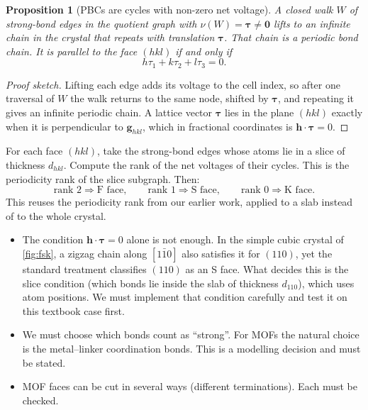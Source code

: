 \documentclass[11pt,a4paper]{article}
\newtheorem{proposition}{Proposition}
\theoremstyle{remark}\newtheorem*{example}{Worked example}
\newcommand{\vect}[1]{\mathbf{#1}}
\begin{document}
\begin{proposition}[PBCs are cycles with non-zero net voltage]\label{prop:pbc}
A closed walk $W$ of strong-bond edges in the quotient graph with $\nu(W)=\vect{\tau}\ne\vect{0}$ lifts to an infinite chain in the crystal that repeats with translation $\vect{\tau}$. That chain is a periodic bond chain. It is parallel to the face $(hkl)$ if and only if
\begin{equation}
h\tau_1+k\tau_2+l\tau_3=0.
\end{equation}
\end{proposition}
\begin{proof}[Proof sketch]
Lifting each edge adds its voltage to the cell index, so after one traversal of $W$ the walk returns to the same node, shifted by $\vect{\tau}$, and repeating it gives an infinite periodic chain. A lattice vector $\vect{\tau}$ lies in the plane $(hkl)$ exactly when it is perpendicular to $\vect{g}_{hkl}$, which in fractional coordinates is $\vect{h}\cdot\vect{\tau}=0$.
\end{proof}

\begin{keyidea}[title=Our proposal]
For each face $(hkl)$, take the strong-bond edges whose atoms lie in a slice of thickness $d_{hkl}$. Compute the rank of the net voltages of their cycles. This is the periodicity rank of the slice subgraph. Then:
\[
\text{rank }2\Rightarrow\text{F face},\qquad\text{rank }1\Rightarrow\text{S face},\qquad\text{rank }0\Rightarrow\text{K face}.
\]
This reuses the periodicity rank from our earlier work, applied to a slab instead of to the whole crystal.
\end{keyidea}

\begin{careful}
\begin{itemize}
\item The condition $\vect{h}\cdot\vect{\tau}=0$ alone is not enough. In the simple cubic crystal of \autoref{fig:fsk}, a zigzag chain along $[1\bar10]$ also satisfies it for $(110)$, yet the standard treatment classifies $(110)$ as an S face. What decides this is the slice condition (which bonds lie inside the slab of thickness $d_{110}$), which uses atom positions. We must implement that condition carefully and test it on this textbook case first.
\item We must choose which bonds count as ``strong''. For MOFs the natural choice is the metal--linker coordination bonds. This is a modelling decision and must be stated.
\item MOF faces can be cut in several ways (different terminations). Each must be checked.
\end{itemize}
\end{careful}
\end{document}
